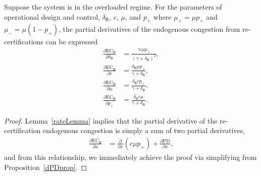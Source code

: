 \documentclass[manuscript,screen,authorversion]{acmart}
\newcommand{\tr}{\textcolor{red}}
\begin{document}
\begin{proposition}\label{dECBprop}
Suppose the system is in the overloaded regime. For the parameters of operational design and control, $\delta_\mathsf{B}$, $c$, $\mu$, and $p_+$ where $\mu_+ = \mu p_+$ and $\mu_- = \mu(1-p_+)$, the partial derivatives of the endogenous congestion from re-certifications can be expressed
\begin{align}
\frac{\partial \mathrm{EC}_\mathsf{B}}{\partial \delta_\mathsf{B}}
&=
\frac{\gamma c\mu p_+ }{(\gamma + \delta_\mathsf{B})^2}
,
\\
\frac{\partial \mathrm{EC}_\mathsf{B}}{\partial c}
&=
\frac{\delta_\mathsf{B} \mu p_+}{\gamma + \delta_\mathsf{B}}
,
\\
\frac{\partial \mathrm{EC}_\mathsf{B}}{\partial \mu}
&=
\frac{\delta_\mathsf{B} c p_+}{\gamma + \delta_\mathsf{B}}
,
\\
\frac{\partial \mathrm{EC}_\mathsf{B}}{\partial p_+}
&=
\frac{\delta_\mathsf{B} c \mu}{\gamma + \delta_\mathsf{B}}
.
\end{align}
\end{proposition}
\begin{proof}
Lemma~\ref{rateLemma} implies that the partial derivative of the re-certification endogenous congestion is simply a sum of two partial derivatives,
\begin{align}
\frac{\partial \mathrm{EC}_\mathsf{B}}{\partial x}
&=
\frac{\partial}{\partial x}\left(c\mu p_+\right) + \frac{\partial \mathrm{PD}}{\partial x}
,
\end{align}
and from this relationship, we immediately achieve the proof via simplifying from Proposition~\ref{dPDprop}.
\end{proof}









\end{document}
